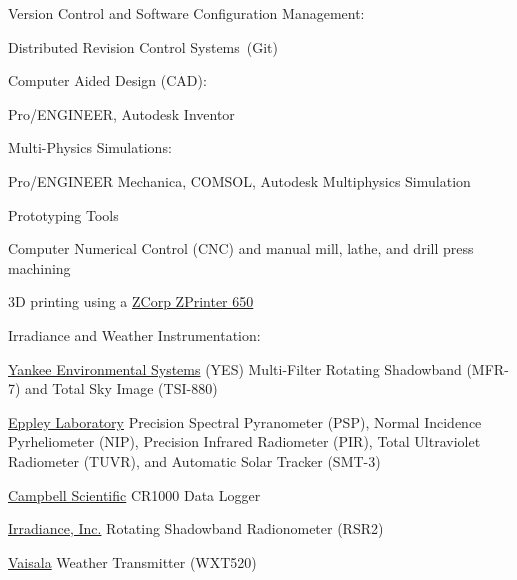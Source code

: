 \documentclass[11pt]{article}
\newcommand{\blankline}{\quad\pagebreak[3]}
\begin{document}
\blankline


Version Control and Software Configuration Management:
\begin{innerlist}
    \item Distributed Revision Control Systems~(Git)
\end{innerlist}


\blankline


Computer Aided Design (CAD):
\begin{innerlist}
	\item Pro/ENGINEER, Autodesk Inventor
\end{innerlist}


\blankline


Multi-Physics Simulations:
\begin{innerlist}
	\item Pro/ENGINEER Mechanica, COMSOL, Autodesk Multiphysics Simulation
\end{innerlist}


\blankline


Prototyping Tools
\begin{innerlist}
    \item Computer Numerical Control (CNC) and manual mill, lathe, and drill press machining
    \item 3D printing using a \href{http://zcorp.com/}{ZCorp ZPrinter 650} 
\end{innerlist}


\blankline


Irradiance and Weather Instrumentation:
\begin{innerlist}
	\item \href{http://www.yesinc.com/}{Yankee Environmental Systems} (YES) Multi-Filter Rotating Shadowband (MFR-7) and Total Sky Image (TSI-880)
	\item \href{http://www.eppleylab.com/}{Eppley Laboratory} Precision Spectral Pyranometer (PSP), Normal Incidence Pyrheliometer (NIP), Precision Infrared Radiometer (PIR), Total Ultraviolet Radiometer (TUVR), and Automatic Solar Tracker (SMT-3)
	\item \href{http://www.campbellsci.com/}{Campbell Scientific} CR1000 Data Logger
	\item \href{http://irradiance.com/}{Irradiance, Inc.} Rotating Shadowband Radionometer (RSR2)
	\item \href{http://www.vaisala.com/}{Vaisala} Weather Transmitter (WXT520)
\end{innerlist}


\blankline
\end{document}

